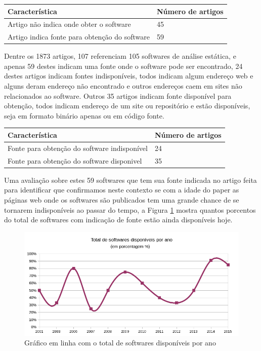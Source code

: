 \begin{table}[H]
\centering
\begin{tabular}{| l | l |}
  \hline
  {\bf Característica}                          & {\bf Número de artigos} \\
  \hline
  Artigo não indica onde obter o software       & 45 \\
  \hline
  Artigo indica fonte para obtenção do software & 59 \\
  \hline
\end{tabular}
\end{table}

Dentre os 1873 artigos, 107 referenciam 105 softwares de análise estática, e
apenas 59 destes indicam uma fonte onde o software pode ser encontrado, 24
destes artigos indicam fontes indisponíveis, todos indicam algum endereço web e
alguns deram endereço não encontrado e outros endereços caem em sites não
relacionados ao software. Outros 35 artigos indicam fonte disponível para
obtenção, todos indicam endereço de um site ou repositório e estão disponíveis,
seja em formato binário apenas ou em código fonte.

\begin{table}[H]
\centering
\begin{tabular}{| l | l |}
  \hline
  {\bf Característica}                          & {\bf Número de artigos} \\
  \hline
  Fonte para obtenção do software indisponível  & 24 \\
  \hline
  Fonte para obtenção do software disponivel    & 35 \\
  \hline
\end{tabular}
\end{table}

Uma avaliação sobre estes 59 softwares que tem sua fonte indicada no artigo
feita para identificar que confirmamos neste contexto se com a idade do paper
as páginas web onde os softwares são publicados tem uma grande chance de se
tornarem indisponíveis ao passar do tempo, a Figura
\ref{softwares-disponivel-por-ano} mostra quantos porcentos do total de
softwares com indicação de fonte estão ainda disponíveis hoje.

\begin{figure}[h]
  \center
  \includegraphics[scale=0.65]{imagens/softwares-disponivel-por-ano.png}
  \caption{Gráfico em linha com o total de softwares disponíveis por ano}
  \label{softwares-disponivel-por-ano}
\end{figure}

